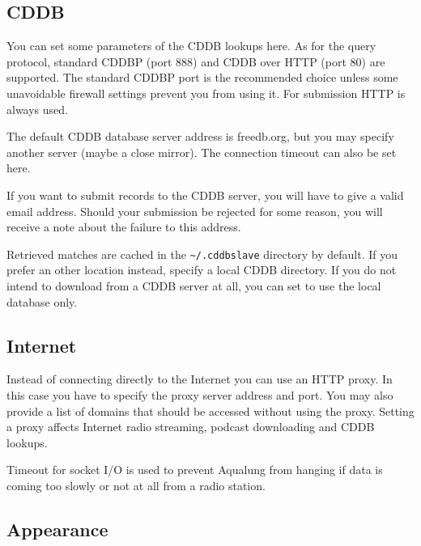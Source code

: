 \documentclass[10pt,english]{article}
\begin{document}
\subsection{CDDB\label{idp1859328}}



\noindent You can set some parameters of the CDDB lookups here. As
for the query protocol, standard CDDBP (port 888) and CDDB
over HTTP (port 80) are supported. The standard CDDBP port is
the recommended choice unless some unavoidable firewall
settings prevent you from using it. For submission HTTP is
always used.




The default CDDB database server address is freedb.org, but
you may specify another server (maybe a close mirror). The
connection timeout can also be set here.




If you want to submit records to the CDDB server, you will
have to give a valid email address. Should your submission be
rejected for some reason, you will receive a note about the
failure to this address.




Retrieved matches are cached in the
\texttt{\textasciitilde{}/.cddbslave} directory by default. If you prefer
an other location instead, specify a local CDDB directory. If
you do not intend to download from a CDDB server at all, you
can set to use the local database only.




\subsection{Internet\label{idp1863008}}



\noindent Instead of connecting directly to the Internet you can use
an HTTP proxy. In this case you have to specify the proxy
server address and port. You may also provide a list of
domains that should be accessed without using the
proxy. Setting a proxy affects Internet radio streaming,
podcast downloading and CDDB lookups.




Timeout for socket I/O is used to prevent Aqualung from
hanging if data is coming too slowly or not at all from a
radio station.




\subsection{Appearance\label{idp1864960}}
\end{document}
